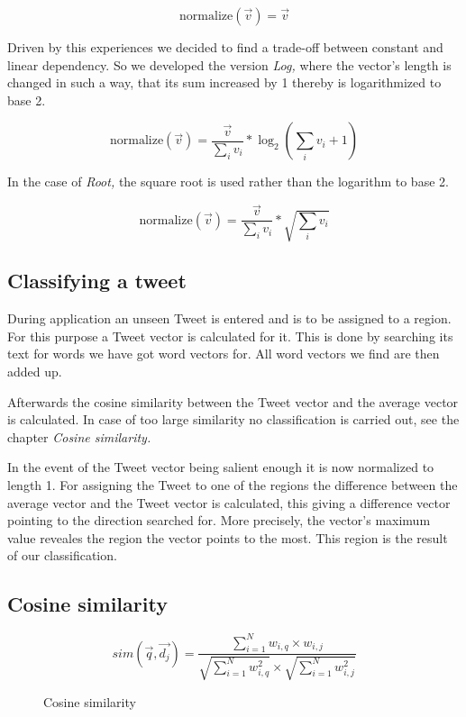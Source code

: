 \documentclass[../Main.tex]{subfiles}
\begin{document}
$$\text{normalize}(\vec v) = \vec v$$

Driven by this experiences we decided to find a trade-off between constant and linear dependency. So we developed the version \textit{Log,} where the vector's length is changed in such a way, that its sum increased by 1 thereby is logarithmized to base 2.

$$\text{normalize}(\vec v) = \frac{\vec v}{\sum_i v_i} * \log_2(\sum_i v_i+1)$$

In the case of \textit{Root,} the square root is used rather than the logarithm to base 2.

$$\text{normalize}(\vec v) = \frac{\vec v}{\sum_i v_i} * \sqrt{\sum_i v_i}$$

\subsection{Classifying a tweet}
During application an unseen Tweet is entered and is to be assigned to a region. For this purpose a Tweet vector is calculated for it. This is done by searching its text for words we have got word vectors for. All word vectors we find are then added up.

Afterwards the cosine similarity between the Tweet vector and the average vector is calculated. In case of too large similarity no classification is carried out, see the chapter \textit{Cosine similarity.} 

In the event of the Tweet vector being salient enough it is now normalized to length 1. For assigning the Tweet to one of the regions the difference between the average vector and the Tweet vector is calculated, this giving a difference vector pointing to the direction searched for. More precisely, the vector's maximum value reveales the region the vector points to the most. This region is the result of our classification.

\subsection{Cosine similarity}
\begin{figure}[t]
  \[ sim(\vec{q},\vec{d_j}) = \frac{\sum^N_{i=1} w_{i,q} \times w_{i,j}}{\sqrt{\sum^N_{i=1}w^2_{i,q}} \times \sqrt{\sum^N_{i=1}w^2_{i,j}}} \]
  \caption{Cosine similarity}
  \label{cos_sim}
\end{figure}
\end{document}
